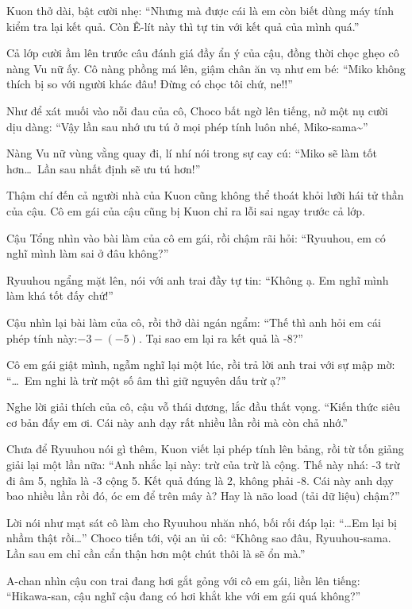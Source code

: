 \documentclass[../main.tex]{subfiles}
\begin{document}
Kuon thở dài, bật cười nhẹ: ``Nhưng mà được cái là em còn biết dùng máy tính kiểm tra lại kết quả. Còn Ê-lít này thì tự tin với kết quả của mình quá.''

Cả lớp cười ầm lên trước câu đánh giá đầy ẩn ý của cậu, đồng thời chọc ghẹo cô nàng Vu nữ ấy. Cô nàng phồng má lên, giậm chân ăn vạ như em bé: ``Miko không thích bị so với người khác đâu! Đừng có chọc tôi chứ, ne!!''

Như để xát muối vào nỗi đau của cô, Choco bất ngờ lên tiếng, nở một nụ cười dịu dàng: ``Vậy lần sau nhớ ưu tú ở mọi phép tính luôn nhé, Miko-sama\~{}''

Nàng Vu nữ vùng vằng quay đi, lí nhí nói trong sự cay cú: ``Miko sẽ làm tốt hơn\dots\ Lần sau nhất định sẽ ưu tú hơn!''

\ct

Thậm chí đến cả người nhà của Kuon cũng không thể thoát khỏi lưỡi hái tử thần của cậu. Cô em gái của cậu cũng bị Kuon chỉ ra lỗi sai ngay trước cả lớp.

Cậu Tổng nhìn vào bài làm của cô em gái, rồi chậm rãi hỏi: ``Ryuuhou, em có nghĩ mình làm sai ở đâu không?''

Ryuuhou ngẩng mặt lên, nói với anh trai đầy tự tin: ``Không ạ. Em nghĩ mình làm khá tốt đấy chứ!''

Cậu nhìn lại bài làm của cô, rồi thở dài ngán ngẩm: ``Thế thì anh hỏi em cái phép tính này:\( -3 - (-5)\). Tại sao em lại ra kết quả là -8?''

Cô em gái giật mình, ngẫm nghĩ lại một lúc, rồi trả lời anh trai với sự mập mờ: ``\dots\ Em nghi là trừ một số âm thì giữ nguyên dấu trừ ạ?''

Nghe lời giải thích của cô, cậu vỗ thái dương, lắc đầu thất vọng. ``Kiến thức siêu cơ bản đấy em ơi. Cái này anh dạy rất nhiều lần rồi mà còn chả nhớ.''

Chưa để Ryuuhou nói gì thêm, Kuon viết lại phép tính lên bảng, rồi từ tốn giảng giải lại một lần nữa: ``Anh nhắc lại này: trừ của trừ là cộng. Thế này nhá: -3 trừ đi âm 5, nghĩa là -3 cộng 5. Kết quả đúng là 2, không phải -8. Cái này anh dạy bao nhiều lần rồi đó, óc em để trên mây à? Hay là não load (tải dữ liệu) chậm?''

Lời nói như mạt sát cô làm cho Ryuuhou nhăn nhó, bối rối đáp lại: ``\dots Em lại bị nhầm thật rồi\dots'' Choco tiến tới, vội an ủi cô: ``Không sao đâu, Ryuuhou-sama. Lần sau em chỉ cần cẩn thận hơn một chút thôi là sẽ ổn mà.''

A-chan nhìn cậu con trai đang hơi gắt gỏng với cô em gái, liền lên tiếng: ``Hikawa-san, cậu nghĩ cậu đang có hơi khắt khe với em gái quá không?''
\end{document}
